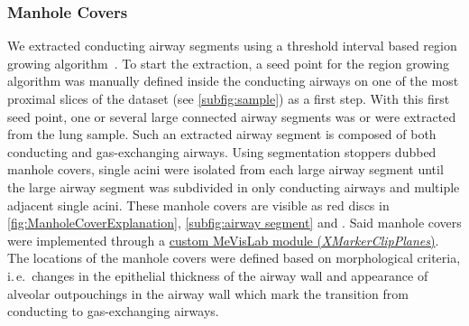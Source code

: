 \documentclass[paper=a4,abstract=true,english,DIV=calc]{scrartcl}
\newcommand{\ie}{i.\,e.\ }
\begin{document}
\subsubsection{Manhole Covers}
We extracted conducting airway segments using a threshold interval based region growing algorithm~\cite{Zucker1976}.
To start the extraction, a seed point for the region growing algorithm was manually defined inside the conducting airways on one of the most proximal slices of the dataset (see \autoref{subfig:sample}) as a first step.
With this first seed point, one or several large connected airway segments was or were extracted from the lung sample.
Such an extracted airway segment is composed of both conducting and gas-exchanging airways.
Using segmentation stoppers dubbed manhole covers, single acini were isolated from each large airway segment until the large airway segment was subdivided in only conducting airways and multiple adjacent single acini.
These manhole covers are visible as red discs in \autoref{fig:ManholeCoverExplanation}, \autoref{subfig:airway segment} and .
Said manhole covers were implemented through a \href{http://www.mevis-research.de/cgi-bin/discus/board-auth.cgi?lm=1282233250&file=/839/11760.html}{custom MeVisLab module (\emph{XMarkerClipPlanes})}.
The locations of the manhole covers were defined based on morphological criteria, \ie changes in the epithelial thickness of the airway wall and appearance of alveolar outpouchings in the airway wall which mark the transition from conducting to gas-exchanging airways.
\end{document}
